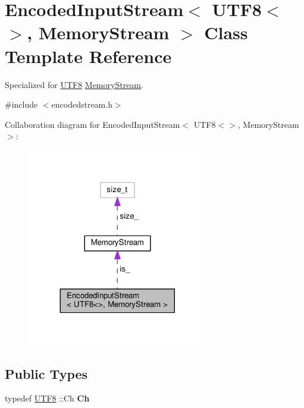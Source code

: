 \hypertarget{classEncodedInputStream_3_01UTF8_3_4_00_01MemoryStream_01_4}{}\section{Encoded\+Input\+Stream$<$ U\+T\+F8$<$$>$, Memory\+Stream $>$ Class Template Reference}
\label{classEncodedInputStream_3_01UTF8_3_4_00_01MemoryStream_01_4}


Specialized for \hyperlink{structUTF8}{U\+T\+F8} \hyperlink{structMemoryStream}{Memory\+Stream}.  




{\ttfamily \#include $<$encodedstream.\+h$>$}



Collaboration diagram for Encoded\+Input\+Stream$<$ U\+T\+F8$<$$>$, Memory\+Stream $>$\+:
\nopagebreak
\begin{figure}[H]
\begin{center}
\leavevmode
\includegraphics[width=224pt]{classEncodedInputStream_3_01UTF8_3_4_00_01MemoryStream_01_4__coll__graph}
\end{center}
\end{figure}
\subsection*{Public Types}
\begin{DoxyCompactItemize}
\item 
\mbox{\label{classEncodedInputStream_3_01UTF8_3_4_00_01MemoryStream_01_4_a091eb31dd2554bf10054148953f9b3bf}} 
typedef \hyperlink{structUTF8}{U\+T\+F8} \+::Ch {\bfseries Ch}
\end{DoxyCompactItemize}
